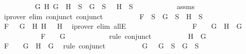 \begin{isabellebody}
\ \ \ \ \ \ \ \ \isamarkupfalse%
\ {\isachardoublequoteopen}{\isasymforall}G\ H{\isachardot}\ \isactrlbold {\isasymnot}{\isacharparenleft}G\ \isactrlbold {\isasymrightarrow}\ H{\isacharparenright}\ {\isasymin}\ S\ {\isasymlongrightarrow}\ G\ {\isasymin}\ S\ {\isasymand}\ \isactrlbold {\isasymnot}\ H\ {\isasymin}\ S{\isachardoublequoteclose}\isanewline
\ \ \ \ \ \ \ \ \ \ \isamarkupfalse%
\ assms\ \isamarkupfalse%
\ {\isacharparenleft}iprover\ elim{\isacharcolon}\ conjunct{}\ conjunct{}{\isacharparenright}\isanewline
\ \ \ \ \ \ \ \ \isamarkupfalse%
\ {\isachardoublequoteopen}F\ {\isasymin}\ S\ {\isasymlongrightarrow}\ G\ {\isasymin}\ S\ {\isasymand}\ H\ {\isasymin}\ S{\isachardoublequoteclose}\isanewline
\ \ \ \ \ \ \ \ \ \ \isamarkupfalse%
\ {\isacartoucheopen}F\ {\isacharequal}\ \isactrlbold {\isasymnot}\ {\isacharparenleft}G\ \isactrlbold {\isasymrightarrow}\ H{}{\isacharparenright}{\isacartoucheclose}\ {\isacartoucheopen}H\ {\isacharequal}\ \isactrlbold {\isasymnot}\ H{}{\isacartoucheclose}\ \isamarkupfalse%
\ {\isacharparenleft}iprover\ elim{\isacharcolon}\ allE{\isacharparenright}\isanewline
\ \ \ \ \ \ \isamarkupfalse%
\ \isanewline
\ \ \ \ \ \ \ \ \isamarkupfalse%
\ {\isachardoublequoteopen}F\ {\isacharequal}\ \isactrlbold {\isasymnot}\ {\isacharparenleft}\isactrlbold {\isasymnot}\ G{\isacharparenright}\ {\isasymand}\ H\ {\isacharequal}\ G{\isachardoublequoteclose}\isanewline
\ \ \ \ \ \ \ \ \isamarkupfalse%
\ \isamarkupfalse%
\ {\isachardoublequoteopen}F\ {\isacharequal}\ \isactrlbold {\isasymnot}\ {\isacharparenleft}\isactrlbold {\isasymnot}\ G{\isacharparenright}{\isachardoublequoteclose}\isanewline
\ \ \ \ \ \ \ \ \ \ \isamarkupfalse%
\ {\isacharparenleft}rule\ conjunct{}{\isacharparenright}\isanewline
\ \ \ \ \ \ \ \ \isamarkupfalse%
\ {\isachardoublequoteopen}H\ {\isacharequal}\ G{\isachardoublequoteclose}\isanewline
\ \ \ \ \ \ \ \ \ \ \isamarkupfalse%
\ {\isacartoucheopen}F\ {\isacharequal}\ \isactrlbold {\isasymnot}\ {\isacharparenleft}\isactrlbold {\isasymnot}\ G{\isacharparenright}\ {\isasymand}\ H\ {\isacharequal}\ G{\isacartoucheclose}\ \isamarkupfalse%
\ {\isacharparenleft}rule\ conjunct{}{\isacharparenright}\isanewline
\ \ \ \ \ \ \ \ \isamarkupfalse%
\ {\isachardoublequoteopen}{\isasymforall}G{\isachardot}\ \isactrlbold {\isasymnot}\ {\isacharparenleft}\isactrlbold {\isasymnot}\ G{\isacharparenright}\ {\isasymin}\ S\ {\isasymlongrightarrow}\ G\ {\isasymin}\ S{\isachardoublequoteclose}\isanewline

\end{isabellebody}
